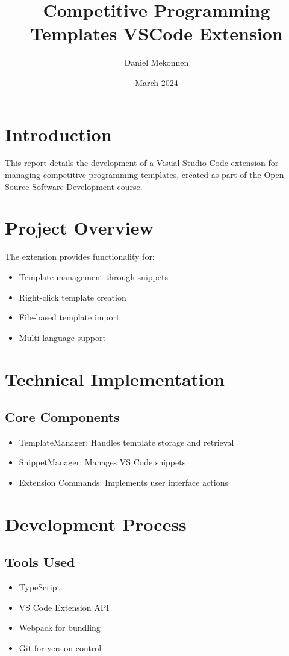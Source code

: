\documentclass{article}
\title{Competitive Programming Templates VSCode Extension}
\author{Daniel Mekonnen}
\date{March 2024}
\begin{document}
\maketitle

\section{Introduction}
This report details the development of a Visual Studio Code extension for managing competitive programming templates, created as part of the Open Source Software Development course.

\section{Project Overview}
The extension provides functionality for:
\begin{itemize}
    \item Template management through snippets
    \item Right-click template creation
    \item File-based template import
    \item Multi-language support
\end{itemize}

\section{Technical Implementation}
\subsection{Core Components}
\begin{itemize}
    \item TemplateManager: Handles template storage and retrieval
    \item SnippetManager: Manages VS Code snippets
    \item Extension Commands: Implements user interface actions
\end{itemize}

\section{Development Process}
\subsection{Tools Used}
\begin{itemize}
    \item TypeScript
    \item VS Code Extension API
    \item Webpack for bundling
    \item Git for version control
\end{itemize}
\end{document}
